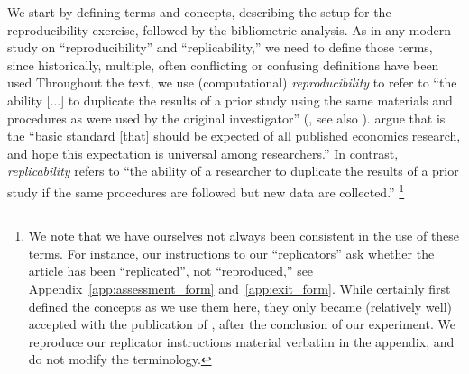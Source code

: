 


We start by defining  terms and concepts, describing the setup for the reproducibility exercise, followed by the bibliometric analysis.
%
As in any modern study on ``reproducibility'' and ``replicability,'' we need to define those terms, since historically, multiple, often conflicting or confusing definitions have been used \parencite{Pesaran2003,Hamermesh2007,Bollen2015-vb,Clemens2015,nasem2019}
%
Throughout the text, we use (computational) \textit{reproducibility} to refer to ``the ability [$\dots$] to duplicate the results of a prior study using the same materials and procedures as were used by the original investigator'' (\citet{Bollen2015-vb}, see also \citet{nasem2019}). \textcite[p. 942]{Christensen2018} argue that is the ``basic standard [that] should be expected of all published economics research, and hope this expectation is universal among researchers.'' In contrast, \textit{replicability} refers to ``the ability of a researcher to duplicate the results of a prior study if the same procedures are followed but new data are collected.''%
%
\footnote{\label{fn:confusion}We note that we have ourselves not always been consistent in the use of these terms. For instance, our instructions to our ``replicators'' ask whether the article has been ``replicated'', not ``reproduced,'' see Appendix~\ref{app:assessment_form} and~\ref{app:exit_form}. While \citet{Bollen2015-vb} certainly first defined the concepts as we use them here, they only became (relatively well) accepted with the publication of \citet{nasem2019}, after the conclusion of our experiment. We reproduce our replicator instructions material verbatim in the appendix, and do not modify the terminology.}

